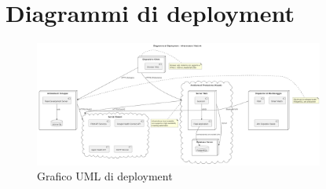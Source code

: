 \documentclass[12pt,a4paper,oneside]{report}
\begin{document}
\section{Diagrammi di deployment}
\begin{figure}[H]
    \centering
    \includegraphics[width=0.85\textwidth]{images/uml/InfrastructureDeployment.png}
    \caption{Grafico UML di deployment}
    \label{fig:uml-depl-graph}
\end{figure}
\end{document}
